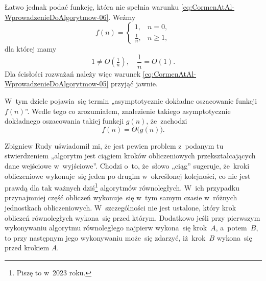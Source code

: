 \documentclass[a4paper,11pt]{article}
\begin{document}
Łatwo jednak podać funkcję, która nie spełnia warunku
\eqref{eq:CormenAtAl-WprowadzenieDoAlgorytmow-06}. Weźmy
\begin{equation}
  \label{eq:CormenAtAl-WprowadzenieDoAlgorytmow-07}
  f( n ) =
  \begin{cases}
    1, & n = 0, \\
    \frac{ 1 }{ n }, & n \geq 1,
  \end{cases}
\end{equation}
dla której mamy
\begin{equation}
  \label{eq:CormenAtAl-WprowadzenieDoAlgorytmow-08}
  1 \neq O\!\left( \tfrac{ 1 }{ n } \right), \quad
  \frac{ 1 }{ n } = O( 1 ).
\end{equation}
Dla ścisłości rozważań należy więc warunek
\eqref{eq:CormenAtAl-WprowadzenieDoAlgorytmow-05} przyjąć jawnie.

\vspace{\spaceFour}





\noindent
W~tym dziele pojawia~się termin „asymptotycznie dokładne oszacowanie funkcji
$f( n )$”. Wedle tego co zrozumiałem, znalezienie takiego asymptotycznie
dokładnego oszacowania takiej funkcji $g( n )$, że~zachodzi
\begin{equation}
  \label{eq:CormenAtAl-WprowadzenieDoAlgorytmow-09}
  f( n ) = \Theta\big( g( n ) \big).
\end{equation}










\noindent
{} Zbigniew Rudy uświadomił mi, że jest pewien problem
z~podanym tu stwierdzeniem „algorytm jest ciągiem kroków obliczeniowych
przekształcających dane wejściowe w~wyjściowe”. Chodzi o~to, że~słowo
„ciąg” sugeruje, że~kroki obliczeniowe wykonuje~się jeden po drugim
w~określonej kolejności, co nie jest prawdą dla tak ważnych
dziś\footnote{Piszę to w~2023 roku.} algorytmów równoległych. W~ich przypadku
przynajmniej część obliczeń wykonuje~się w~tym samym czasie w~różnych
jednostkach obliczeniowych. W~szczególności nie jest ustalone, który krok
obliczeń równoległych wykona~się przed którym. Dodatkowo jeśli przy
pierwszym wykonywaniu algorytmu równoległego najpierw wykona~się krok~$A$,
a~potem~$B$, to przy następnym jego wykonywaniu może~się zdarzyć, iż~krok~$B$
wykona~się przed krokiem $A$.
\end{document}
